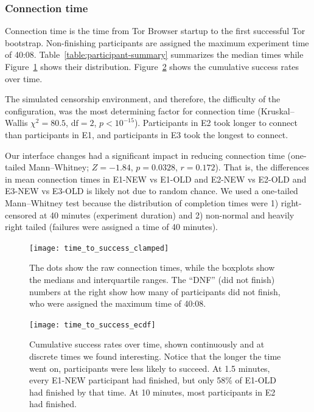 \documentclass[USenglish,oneside,twocolumn]{article}
\begin{document}

\subsubsection{Connection time} 
Connection time is the time from Tor Browser startup to the first successful Tor bootstrap. Non-finishing participants are assigned the maximum experiment time of 40:08. Table~\ref{table:participant-summary} summarizes the median times while Figure~\ref{fig:time_to_success_clamped} shows their distribution. Figure~\ref{fig:time_to_success_ecdf} shows the cumulative success rates over time. 

The simulated censorship environment, and therefore, the difficulty of the configuration, was the most determining factor for connection time (Kruskal--Wallis $\chi^2 = 80.5$, $\mbox{df} = 2$, $p < 10^{-15}$). Participants in E2 took longer to connect than participants in E1, and participants in E3 took the longest to connect.

Our interface changes had a significant impact in reducing connection time (one-tailed Mann--Whitney; $ Z = -1.84$, $p = 0.0328$, $r= 0.172$). That is, the differences in mean connection times in E1-NEW vs E1-OLD and E2-NEW vs E2-OLD and E3-NEW vs E3-OLD is likely not due to random chance. We used a one-tailed Mann--Whitney test because the distribution of completion times were 1) right-censored at 40 minutes (experiment duration) and 2) non-normal and heavily right tailed (failures were assigned a time of 40 minutes). 

\begin{figure}[t]
\centering
\texttt{[image: time\_to\_success\_clamped]}
\caption{
The dots show the raw connection times,
while the boxplots show the medians and interquartile ranges.
The ``DNF'' (did not finish) numbers at the right show how many of participants 
did not finish, who were assigned the maximum time of 40:08.}
\label{fig:time_to_success_clamped}
\end{figure}

\begin{figure}[t]
\centering
\texttt{[image: time\_to\_success\_ecdf]}

\caption{
Cumulative success rates over time, shown continuously and at discrete times we found interesting.
Notice that the longer the time went on, participants were less likely to succeed. 
At 1.5 minutes, every E1-NEW participant had finished,
but only 58\% of E1-OLD had finished by that time.  
At 10 minutes, most participants in E2 had finished. 
}
\label{fig:time_to_success_ecdf}
\end{figure}
\end{document}
